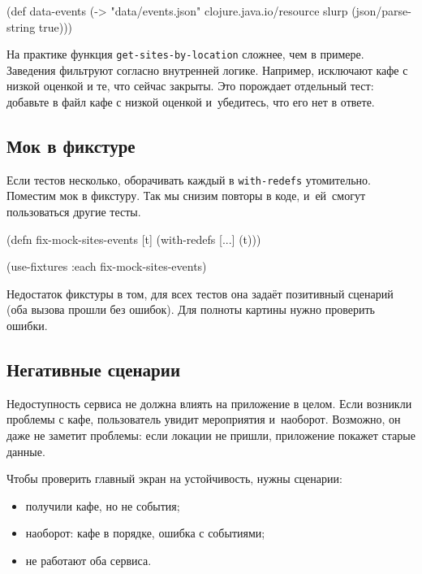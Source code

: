 
\begin{english}
  \begin{clojure}
(def data-events
  (-> "data/events.json"
      clojure.java.io/resource
      slurp
      (json/parse-string true)))
  \end{clojure}
\end{english}

На практике функция \verb|get-sites-by-location| сложнее, чем в
примере. Заведения фильтруют согласно внутренней логике. Например, исключают
кафе с низкой оценкой и те, что сейчас закрыты. Это порождает отдельный тест:
добавьте в файл кафе с низкой оценкой и~убедитесь, что его нет в ответе.

\subsection{Мок в фикстуре}


Если тестов несколько, оборачивать каждый в \verb|with-redefs|
утомительно. Поместим мок в фикстуру. Так мы снизим повторы в коде, и~ей~смогут
пользоваться другие тесты.

\begin{english}
  \begin{clojure}
(defn fix-mock-sites-events [t]
  (with-redefs [...]
    (t)))

(use-fixtures :each fix-mock-sites-events)
  \end{clojure}
\end{english}

Недостаток фикстуры в том, для всех тестов она задаёт позитивный сценарий (оба
вызова прошли без ошибок). Для полноты картины нужно проверить ошибки.

\subsection{Негативные сценарии}


Недоступность сервиса не должна влиять на приложение в целом. Если возникли
проблемы с кафе, пользователь увидит мероприятия и~наоборот. Возможно, он даже
не заметит проблемы: если локации не пришли, приложение покажет старые данные.

Чтобы проверить главный экран на устойчивость, нужны сценарии:

\begin{itemize}

\item
  получили кафе, но не события;

\item
  наоборот: кафе в порядке, ошибка с событиями;

\item
  не работают оба сервиса.

\end{itemize}

